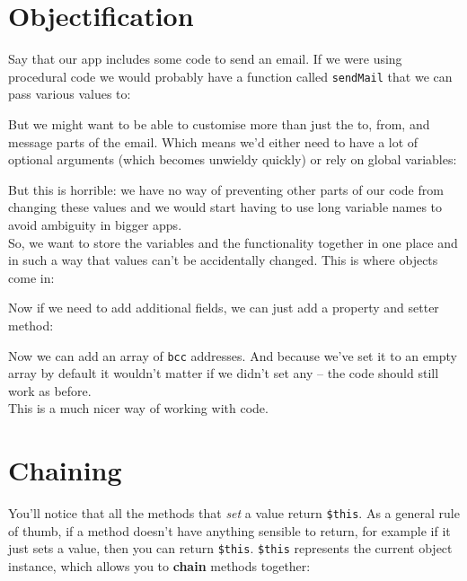 \pagebreak

\section{Objectification}

Say that our app includes some code to send an email. If we were using procedural code we would probably have a function called \texttt{sendMail} that we can pass various values to:


But we might want to be able to customise more than just the to, from, and message parts of the email. Which means we'd either need to have a lot of optional arguments (which becomes unwieldy quickly) or rely on global variables:


But this is horrible: we have no way of preventing other parts of our code from changing these values and we would start having to use long variable names to avoid ambiguity in bigger apps.
\\

So, we want to store the variables and the functionality together in one place and in such a way that values can't be accidentally changed. This is where objects come in:


Now if we need to add additional fields, we can just add a property and setter method:


Now we can add an array of \texttt{bcc} addresses. And because we've set it to an empty array by default it wouldn't matter if we didn't set any – the code should still work as before.
\\

This is a much nicer way of working with code.


\section{Chaining}

You'll notice that all the methods that \textit{set} a value return \texttt{\$this}. As a general rule of thumb, if a method doesn't have anything sensible to return, for example if it just sets a value, then you can return \texttt{\$this}. \texttt{\$this} represents the current object instance, which allows you to \textbf{chain} methods together:

